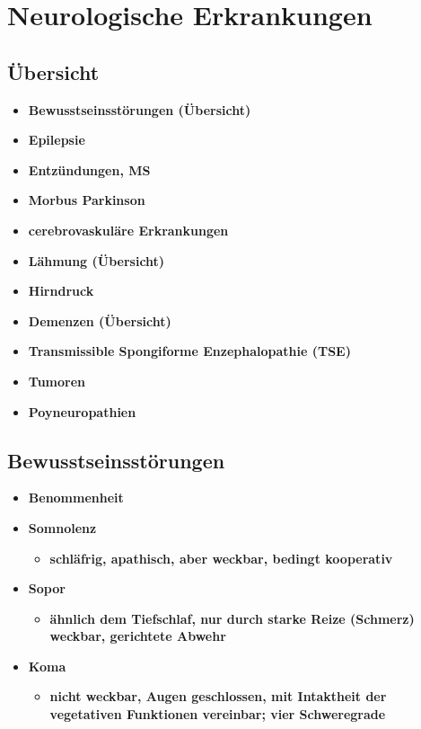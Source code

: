 \section{Neurologische Erkrankungen}
\subsection{Übersicht}
	\begin{itemize}
		\item \textbf{Bewusstseinsstörungen (Übersicht)}
		\item \textbf{Epilepsie}
		\item \textbf{Entzündungen, MS}
		\item \textbf{Morbus Parkinson}
		\item \textbf{cerebrovaskuläre Erkrankungen}
		\item \textbf{Lähmung (Übersicht)}
		\item \textbf{Hirndruck}
		\item \textbf{Demenzen (Übersicht)}
		\item \textbf{Transmissible Spongiforme Enzephalopathie (TSE)}
		\item \textbf{Tumoren}
		\item \textbf{Poyneuropathien}
	\end{itemize}
	
\subsection{Bewusstseinsstörungen}
	\begin{itemize}
		\item \textbf{Benommenheit}
		\item \textbf{Somnolenz}
			\begin{itemize}
				\item \textbf{schläfrig, apathisch, aber weckbar, bedingt kooperativ}
			\end{itemize}
		\item \textbf{Sopor}
			\begin{itemize}
				\item \textbf{ähnlich dem Tiefschlaf, nur durch starke Reize (Schmerz) weckbar, gerichtete Abwehr}
			\end{itemize}
		\item \textbf{Koma}
			\begin{itemize}
				\item \textbf{nicht weckbar, Augen geschlossen, mit Intaktheit der vegetativen Funktionen vereinbar; vier Schweregrade}
			\end{itemize}
	\end{itemize}
	
